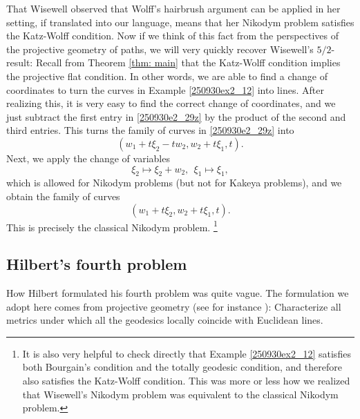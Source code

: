 \documentclass{article}
\numberwithin{equation}{section}
\theoremstyle{plain}
\begin{document}
That Wisewell \cite{Wis03} observed that Wolff's hairbrush argument can be applied in her setting, if translated into our language, means that her Nikodym problem satisfies the Katz-Wolff condition. Now if we think of this fact from the perspectives of the projective geometry of paths, we will very quickly recover Wisewell's $5/2$-result: Recall from Theorem \ref{thm: main} that the Katz-Wolff condition implies the projective flat condition. In other words, we are able to find a change of coordinates to turn the curves in Example \ref{250930ex2_12} into lines. After realizing this, it is very easy to find the correct change of coordinates, and we just subtract the first entry in \eqref{250930e2_29z} by the product of the second and third entries. This turns the family of curves in \eqref{250930e2_29z} into
\begin{equation}\label{250930e2_29zz}
(w_1+ t\xi_2-t w_2, w_2+ t\xi_1, t). 
\end{equation}
Next, we apply the change of variables 
\begin{equation}
\xi_2\mapsto \xi_2+ w_2, \ \ \xi_1\mapsto \xi_1,
\end{equation}
which is allowed for Nikodym problems (but not for Kakeya problems), and we obtain the family of curves 
\begin{equation}
(w_1+ t\xi_2, w_2+ t\xi_1, t). 
\end{equation}
This is precisely the classical Nikodym problem. \footnote{It is also very helpful to check directly that Example \ref{250930ex2_12} satisfies both Bourgain's condition and the totally geodesic condition, and therefore also satisfies the Katz-Wolff condition. This was more or less how we realized that Wisewell's Nikodym problem was equivalent to the classical Nikodym problem. }



\subsection{Hilbert's fourth problem}






How Hilbert formulated his fourth problem was quite vague. The formulation we adopt here comes from projective geometry (see for instance \cite[Section 12.2]{Shen01}):  Characterize all metrics under which all the geodesics locally coincide with Euclidean lines. \\
\end{document}
